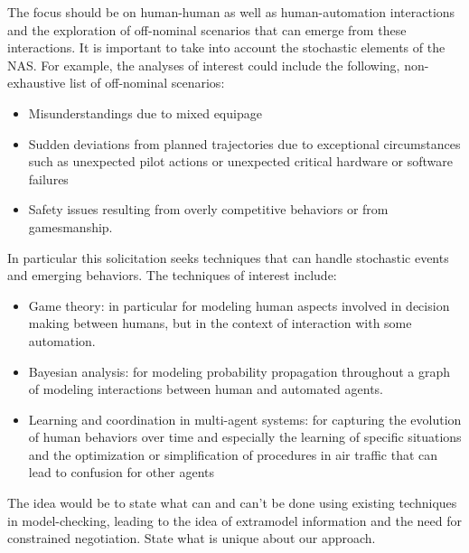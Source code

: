 The focus should be on human-human as well as human-automation
interactions and the exploration of off-nominal scenarios that can
emerge from these interactions. It is important to take into account
the stochastic elements of the NAS. For example, the analyses of
interest could include the following, non-exhaustive list of
off-nominal scenarios:
\begin{itemize}
\item Misunderstandings due to mixed equipage
\item Sudden deviations from planned trajectories due to exceptional circumstances 
such as unexpected pilot actions or unexpected critical hardware or software 
failures
\item Safety issues resulting from overly competitive behaviors or from gamesmanship.
\end{itemize}

In particular this solicitation seeks techniques that can handle stochastic events and 
emerging behaviors. The techniques of interest include:
\begin{itemize}
\item Game theory: in particular for modeling human aspects involved in decision 
making between humans, but in the context of interaction with some automation.
\item Bayesian analysis: for modeling probability propagation throughout a graph of 
modeling interactions between human and automated agents.
\item Learning and coordination in multi-agent systems: for capturing the evolution of 
human behaviors over time and especially the learning of specific situations and 
the optimization or simplification of procedures in air traffic that can lead to 
confusion for other agents
\end{itemize}

The idea would be to state what can and can’t be done using existing
techniques in model-checking, leading to the idea of extramodel
information and the need for constrained negotiation.  State what is
unique about our approach.
